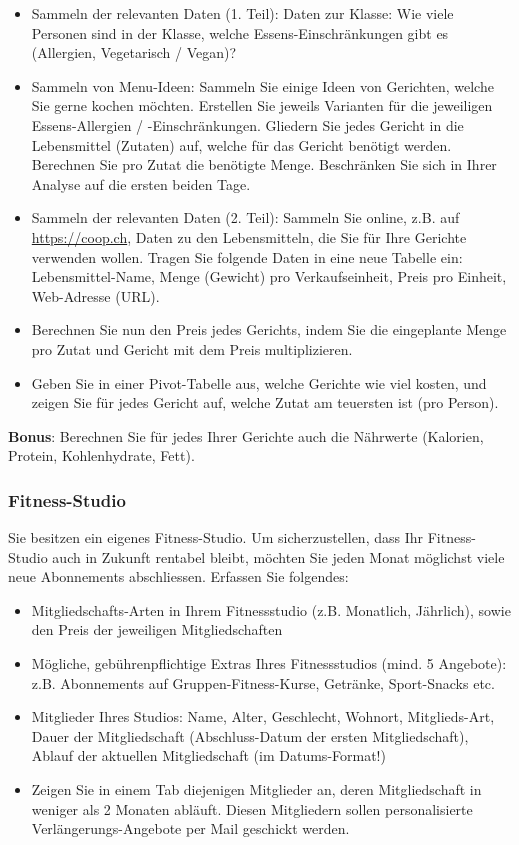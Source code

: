 \begin{itemize}
	\item Sammeln der relevanten Daten (1. Teil): Daten zur Klasse: Wie viele Personen sind in der Klasse, welche Essens-Einschränkungen gibt es (Allergien, Vegetarisch / Vegan)?
	\item Sammeln von Menu-Ideen: Sammeln Sie einige Ideen von Gerichten, welche Sie gerne kochen möchten. Erstellen Sie jeweils Varianten für die jeweiligen Essens-Allergien / -Einschränkungen. Gliedern Sie jedes Gericht in die Lebensmittel (Zutaten) auf, welche für das Gericht benötigt werden. Berechnen Sie pro Zutat die benötigte Menge. Beschränken Sie sich in Ihrer Analyse auf die ersten beiden Tage.
	\item Sammeln der relevanten Daten (2. Teil): Sammeln Sie online, z.B. auf \url{https://coop.ch}, Daten zu den Lebensmitteln, die Sie für Ihre Gerichte verwenden wollen. Tragen Sie folgende Daten in eine neue Tabelle ein: Lebensmittel-Name, Menge (Gewicht) pro Verkaufseinheit, Preis pro Einheit, Web-Adresse (URL).
	\item Berechnen Sie nun den Preis jedes Gerichts, indem Sie die eingeplante Menge pro Zutat und Gericht mit dem Preis multiplizieren.
	\item Geben Sie in einer Pivot-Tabelle aus, welche Gerichte wie viel kosten, und zeigen Sie für jedes Gericht auf, welche Zutat am teuersten ist (pro Person).
\end{itemize}
\textbf{Bonus}: Berechnen Sie für jedes Ihrer Gerichte auch die Nährwerte (Kalorien, Protein, Kohlenhydrate, Fett).

\subsubsection*{Fitness-Studio}
Sie besitzen ein eigenes Fitness-Studio. Um sicherzustellen, dass Ihr Fitness-Studio auch in Zukunft rentabel bleibt, möchten Sie jeden Monat möglichst viele neue Abonnements abschliessen. Erfassen Sie folgendes:

\begin{itemize}
	\item Mitgliedschafts-Arten in Ihrem Fitnessstudio (z.B. Monatlich, Jährlich), sowie den Preis der jeweiligen Mitgliedschaften
	\item Mögliche, gebührenpflichtige Extras Ihres Fitnessstudios (mind. 5 Angebote): z.B. Abonnements auf Gruppen-Fitness-Kurse, Getränke, Sport-Snacks etc.
	\item Mitglieder Ihres Studios: Name, Alter, Geschlecht, Wohnort, Mitglieds-Art, Dauer der Mitgliedschaft (Abschluss-Datum der ersten Mitgliedschaft), Ablauf der aktuellen Mitgliedschaft (im Datums-Format!)
	\item Zeigen Sie in einem Tab diejenigen Mitglieder an, deren Mitgliedschaft in weniger als 2 Monaten abläuft. Diesen Mitgliedern sollen personalisierte Verlängerungs-Angebote per Mail geschickt werden.
\end{itemize}

